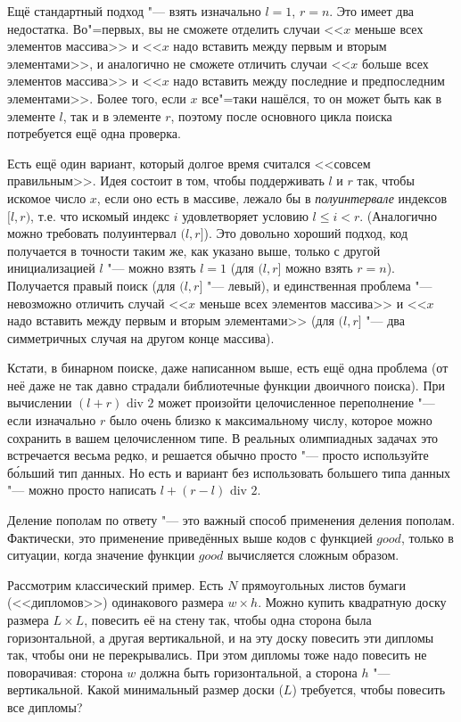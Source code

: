 Ещё стандартный подход "--- взять изначально $l=1$, $r=n$. Это имеет два недостатка. 
Во"=первых, вы не сможете отделить случаи <<$x$ меньше всех элементов массива>> и 
<<$x$ надо вставить между первым и вторым элементами>>, 
и аналогично не сможете отличить случаи <<$x$ больше всех элементов массива>> и 
<<$x$ надо вставить между последние и предпоследним элементами>>.
Более того, если $x$ все"=таки нашёлся, то он может быть как в элементе $l$,
так и в элементе $r$, поэтому после основного цикла поиска потребуется ещё одна проверка.

Есть ещё один вариант, который долгое время считался <<совсем правильным>>. 
Идея состоит в том, чтобы поддерживать $l$ и $r$ так, чтобы искомое число $x$, 
если оно есть в массиве, лежало бы в \textit{полуинтервале} индексов $[l,r)$,
т.е. что искомый индекс $i$ удовлетворяет условию $l\leq i<r$.
(Аналогично можно требовать полуинтервал $(l,r]$).
Это довольно хороший подход, код получается в точности таким же, 
как указано выше, только с другой инициализацией $l$ "--- можно взять $l=1$
(для $(l,r]$ можно взять $r=n$).
Получается правый поиск (для $(l,r]$ "--- левый), и единственная проблема
"--- невозможно отличить случай <<$x$ меньше всех элементов массива>> и 
<<$x$ надо вставить между первым и вторым элементами>>
(для $(l,r]$ "--- два симметричных случая на другом конце массива).

Кстати, в бинарном поиске, даже написанном выше, есть ещё одна проблема 
(от неё даже не так давно страдали библиотечные функции двоичного поиска).
При вычислении $(l+r)\mbox{ div }2$ может произойти целочисленное переполнение "---
если изначально $r$ было очень близко к максимальному числу, которое можно
сохранить в вашем целочисленном типе. 
В реальных олимпиадных задачах это встречается весьма редко, и решается 
обычно просто "--- просто используйте б\'{о}льший тип данных.
Но есть и вариант без использовать большего типа данных
"--- можно просто написать $l+(r-l)\mbox{ div } 2$.

Деление пополам по ответу "--- это важный способ применения деления пополам.
Фактически, это применение приведённых выше кодов с функцией $good$, только 
в ситуации, когда значение функции $good$ вычисляется сложным образом.

Рассмотрим классический пример. 
Есть $N$ прямоугольных листов бумаги (<<дипломов>>) одинакового размера 
$w\times h$. Можно купить квадратную доску размера $L\times L$, 
повесить её на стену так, чтобы одна сторона была горизонтальной,
а другая вертикальной, и на эту доску повесить эти дипломы так,
чтобы они не перекрывались. 
При этом дипломы тоже надо повесить не поворачивая: сторона $w$ должна быть
горизонтальной, а сторона $h$ "--- вертикальной.
Какой минимальный размер доски ($L$) требуется, чтобы повесить все дипломы?

